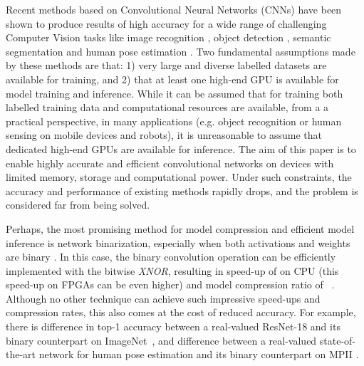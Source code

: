 \documentclass[10pt,twocolumn,letterpaper]{article}
\begin{document}
Recent methods based on Convolutional Neural Networks (CNNs)
have been shown to produce results of high accuracy for a wide range of challenging Computer Vision tasks like image recognition \cite{krizhevsky2012imagenet, simonyan2014very,he2016deep}, object detection \cite{ren2015faster}, semantic segmentation \cite{long2015fully, he2017mask} and human pose estimation \cite{xiao2018simple, newell2016stacked}. Two fundamental assumptions made by these methods are that: 1) very large and diverse labelled datasets are available for training, and 2) that at least one high-end GPU is available for model training and inference. While it can be assumed that for training both labelled training data and computational resources are available, from a a practical perspective, in many applications (e.g. object recognition or human sensing on mobile devices and robots), it is unreasonable to assume that dedicated high-end GPUs are available for inference. The aim of this paper is to enable highly accurate and efficient convolutional networks on devices with limited memory, storage and computational power. Under such constraints, the accuracy and performance of existing methods rapidly drops, and the problem is considered far from being solved.

Perhaps, the most promising method for model compression and efficient model inference is network binarization, especially when both activations and weights are binary  \cite{courbariaux2015binaryconnect, courbariaux2016binarized, rastegari2016xnor}. In this case, the binary convolution operation can be efficiently implemented with the bitwise \textit{XNOR}, resulting in speed-up of  on CPU (this speed-up on FPGAs can be even higher) and model compression ratio of ~\cite{rastegari2016xnor}. Although no other technique can achieve such impressive speed-ups and compression rates, this also comes at the cost of reduced accuracy. For example, there is  difference in top-1 accuracy between a real-valued ResNet-18 and its binary counterpart on ImageNet~\cite{rastegari2016xnor}, and  difference between a real-valued state-of-the-art network for human pose estimation and its binary counterpart on MPII \cite{bulat2017binarized}.    
\end{document}

